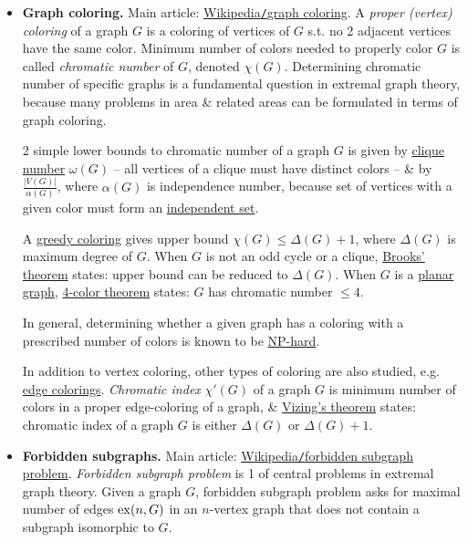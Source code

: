 \documentclass{article}
\begin{document}
\begin{itemize}
	\item {\bf Graph coloring.} Main article: \href{https://en.wikipedia.org/wiki/Graph_coloring}{Wikipedia{\tt/}graph coloring}. A {\it proper (vertex) coloring} of a graph $G$ is a coloring of vertices of $G$ s.t. no 2 adjacent vertices have the same color. Minimum number of colors needed to properly color $G$ is called {\it chromatic number} of $G$, denoted $\chi(G)$. Determining chromatic number of specific graphs is a fundamental question in extremal graph theory, because many problems in area \& related areas can be formulated in terms of graph coloring.
	
	2 simple lower bounds to chromatic number of a graph $G$ is given by \href{https://en.wikipedia.org/wiki/Clique_number}{clique number} $\omega(G)$ -- all vertices of a clique must have distinct colors -- \& by $\frac{|V(G)|}{\alpha(G)}$, where $\alpha(G)$ is independence number, because set of vertices with a given color must form an \href{https://en.wikipedia.org/wiki/Independent_set_(graph_theory)}{independent set}.
	
	A \href{https://en.wikipedia.org/wiki/Greedy_coloring}{greedy coloring} gives upper bound $\chi(G)\le\Delta(G) + 1$, where $\Delta(G)$ is maximum degree of $G$. When $G$ is not an odd cycle or a clique, \href{https://en.wikipedia.org/wiki/Brooks%27_theorem}{Brooks' theorem} states: upper bound can be reduced to $\Delta(G)$. When $G$ is a \href{https://en.wikipedia.org/wiki/Planar_graph}{planar graph}, \href{https://en.wikipedia.org/wiki/Four-color_theorem}{4-color theorem} states: $G$ has chromatic number $\le4$.
	
	In general, determining whether a given graph has a coloring with a prescribed number of colors is known to be \href{https://en.wikipedia.org/wiki/NP-hard}{NP-hard}.
	
	In addition to vertex coloring, other types of coloring are also studied, e.g. \href{https://en.wikipedia.org/wiki/Edge_coloring}{edge colorings}. {\it Chromatic index} $\chi'(G)$ of a graph $G$ is minimum number of colors in a proper edge-coloring of a graph, \& \href{https://en.wikipedia.org/wiki/Vizing%27s_theorem}{Vizing's theorem} states: chromatic index of a graph $G$ is either $\Delta(G)$ or $\Delta(G) + 1$.
	\item {\bf Forbidden subgraphs.} Main article: \href{https://en.wikipedia.org/wiki/Forbidden_subgraph_problem}{Wikipedia{\tt/}forbidden subgraph problem}. {\it Forbidden subgraph problem} is 1 of central problems in extremal graph theory. Given a graph $G$, forbidden subgraph problem asks for maximal number of edges ${\rm ex}(n,G)$ in an $n$-vertex graph that does not contain a subgraph isomorphic to $G$.
	

\end{itemize}
\end{document}
